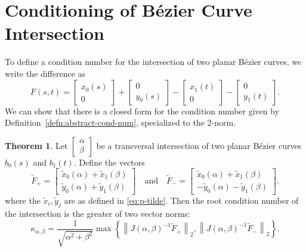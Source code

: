 \documentclass[3p, authoryear, square]{elsarticle}
\theoremstyle{definition}
\newtheorem{theorem}{Theorem}[section]
\begin{document}
\section{Conditioning of B\'{e}zier Curve Intersection}

To define a condition number for the intersection of two planar B\'{e}zier
curves, we write the difference as
\begin{equation}
F(s, t) = \left[ \begin{array}{c} x_0(s) \\ 0 \end{array}\right] +
  \left[ \begin{array}{c} 0 \\ y_0(s) \end{array}\right] -
  \left[ \begin{array}{c} x_1(t) \\ 0 \end{array}\right] -
  \left[ \begin{array}{c} 0 \\ y_1(t) \end{array}\right].
\end{equation}
We can show that there is a closed form for the condition number given
by Definition~\ref{defn:abstract-cond-num}, specialized to the
2-norm.

\begin{theorem}
Let \(\left[\begin{array}{c} \alpha \\ \beta
\end{array}\right]\) be a transversal intersection of two planar
B\'{e}zier curves \(b_0(s)\) and \(b_1(t)\). Define the vectors
\begin{equation}
\widetilde{F}_{+} = \left[ \begin{array}{c}
  \widetilde{x}_0(\alpha) + \widetilde{x}_1(\beta) \\
  \widetilde{y}_0(\alpha) + \widetilde{y}_1(\beta) \end{array}\right] \quad
\text{and} \quad
\widetilde{F}_{-} = \left[ \begin{array}{c}
  \widetilde{x}_0(\alpha) + \widetilde{x}_1(\beta) \\
  -\widetilde{y}_0(\alpha) - \widetilde{y}_1(\beta)\end{array}\right].
\end{equation}
where the \(\widetilde{x}_i, \widetilde{y}_j\) are as defined in
\eqref{eq:p-tilde}.
Then the root condition number of the intersection is the
greater of two vector norms:
\begin{equation}\label{eq:kappa-max}
\kappa_{\alpha, \beta} = \frac{1}{\sqrt{\alpha^2 + \beta^2}} \max \left\{
\left \lVert J\left(\alpha, \beta\right)^{-1} \widetilde{F}_{+}\right \rVert_2,
\left \lVert J\left(\alpha, \beta\right)^{-1} \widetilde{F}_{-}\right \rVert_2
\right\}.
\end{equation}
\end{theorem}
\end{document}
